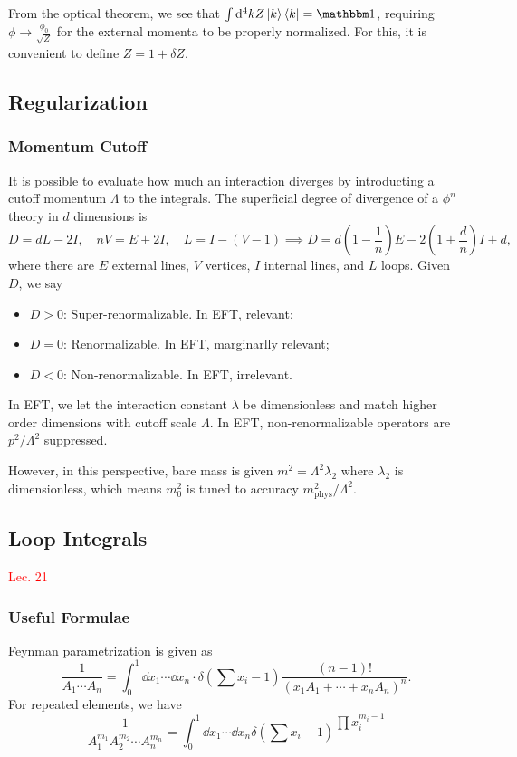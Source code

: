 \documentclass{article}
\begin{document}
From the optical theorem, we see that $\int \dd^4kZ\ket k\bra k=\mathbbm 1$, requiring $\phi\to\frac{\phi_0}{\sqrt Z}$ for the external momenta to be properly normalized. For this, it is convenient to define $Z=1+\delta Z$. 

\subsection{Regularization}
\subsubsection{Momentum Cutoff}
It is possible to evaluate how much an interaction diverges by introducting a cutoff momentum $\Lambda$ to the integrals. The superficial degree of divergence of a $\phi^n$ theory in $d$ dimensions is 
$$D=dL-2I,\quad nV=E+2I,\quad L=I-(V-1)\implies D=d\left(1-\frac 1n\right)E-2\left(1+\frac dn\right)I+d,$$
where there are $E$ external lines, $V$ vertices, $I$ internal lines, and $L$ loops. Given $D$, we say
\begin{itemize}
    \item $D>0$: Super-renormalizable. In EFT, relevant;
    \item $D=0$: Renormalizable. In EFT, marginarlly relevant;
    \item $D<0$: Non-renormalizable. In EFT, irrelevant.
\end{itemize}
In EFT, we let the interaction constant $\lambda$ be dimensionless and match higher order dimensions with cutoff scale $\Lambda$. In EFT, non-renormalizable operators are $p^2/\Lambda^2$ suppressed. 

However, in this perspective, bare mass is given $m^2=\Lambda^2\lambda_2$ where $\lambda_2$ is dimensionless, which means $m_0^2$ is tuned to accuracy $m^2_\text{phys}/\Lambda^2$.

\subsection{Loop Integrals}
\textcolor{red}{Lec. 21}
\subsubsection{Useful Formulae}
Feynman parametrization is given as 
\begin{equation}
    \frac 1{A_1\cdots A_n}=\int^1_0\dd x_1\cdots\dd x_n\cdot\delta\left(\sum x_i-1\right)\frac{(n-1)!}{\left(x_1A_1+\cdots+x_nA_n\right)^n}.
\end{equation}
For repeated elements, we have 
\begin{equation}
    \frac 1{A^{m_1}_1A^{m_2}_2\cdots A^{m_n}_n}=\int^1_0\dd x_1\cdots\dd x_n\delta\left(\sum x_i-1\right)\frac{\prod x_i^{m_i-1} }{}
\end{equation}
\end{document}

